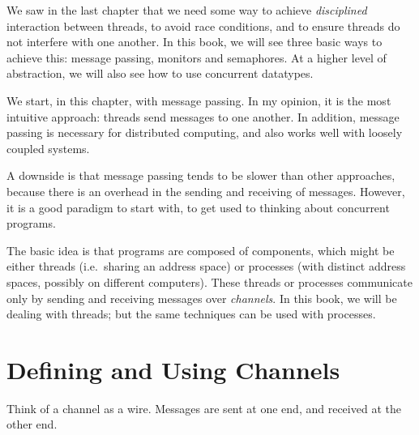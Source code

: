 We saw in the last chapter that we need some way to achieve
\emph{disciplined} interaction between threads, to avoid race conditions, and
to ensure threads do not interfere with one another.  In this book, we will see
three basic ways to achieve this: message passing, monitors and semaphores.
At a higher level of abstraction, we will also see how to use concurrent
datatypes.

We start, in this chapter, with message passing.  In my opinion, it is the
most intuitive approach: threads send messages to one another.  In addition,
message passing is necessary for distributed computing, and also works well
with loosely coupled systems.

A downside is that message passing tends to be slower than other approaches,
because there is an overhead in the sending and receiving of messages.
However, it is a good paradigm to start with, to get used to thinking about
concurrent programs.

The basic idea is that programs are composed of components, which might be
either threads (i.e.~sharing an address space) or processes (with distinct
address spaces, possibly on different computers).  These threads or processes
communicate only by sending and receiving messages over \emph{channels}.  In
this book, we will be dealing with threads; but the same techniques can be
used with processes.


\section{Defining and Using Channels}

Think of a channel as a wire.  Messages are sent at one end, and received at
the other end.



